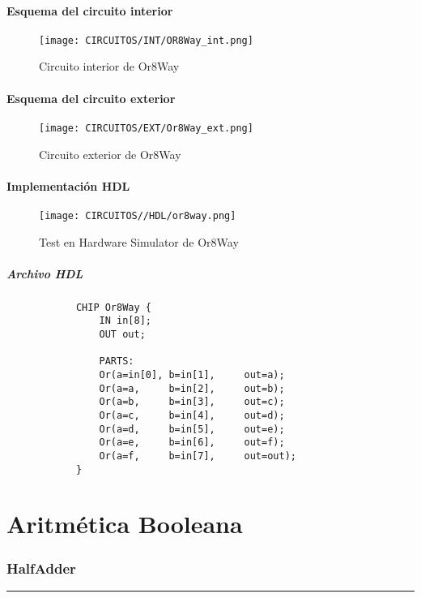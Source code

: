 \documentclass[12pt]{article}
\begin{document}
		\subsection{Esquema del circuito interior}
		\begin{figure}[H]
			\centering
			\texttt{[image: CIRCUITOS/INT/OR8Way\_int.png]}            \caption{Circuito interior de Or8Way \cite{circuitverse}}
			\label{fig:or8way_int}
		\end{figure}
		\subsection{Esquema del circuito exterior}
		\begin{figure}[H]
			\centering
			\texttt{[image: CIRCUITOS/EXT/Or8Way\_ext.png]}            \caption{Circuito exterior de Or8Way \cite{circuitverse}}
			\label{fig:or8way_ext}
		\end{figure}
		\subsection{Implementación HDL}
		\begin{figure}[H]
			\centering
			\texttt{[image: CIRCUITOS//HDL/or8way.png]}
			\caption{Test en Hardware Simulator de Or8Way \cite{nand2tetris}}
			\label{fig:hdlor8way}
		\end{figure}
		\subsubsection{Archivo HDL}
		\begin{lstlisting}
			CHIP Or8Way {
				IN in[8];
				OUT out;

				PARTS:
				Or(a=in[0], b=in[1],     out=a);
				Or(a=a,     b=in[2],     out=b);
				Or(a=b,     b=in[3],     out=c);
				Or(a=c,     b=in[4],     out=d);
				Or(a=d,     b=in[5],     out=e);
				Or(a=e,     b=in[6],     out=f);
				Or(a=f,     b=in[7],     out=out);
			}
		\end{lstlisting}
		\newpage
	\part{Aritmética Booleana}
	\section{HalfAdder}
	\hrule
	\vspace{0.5cm}
\end{document}
